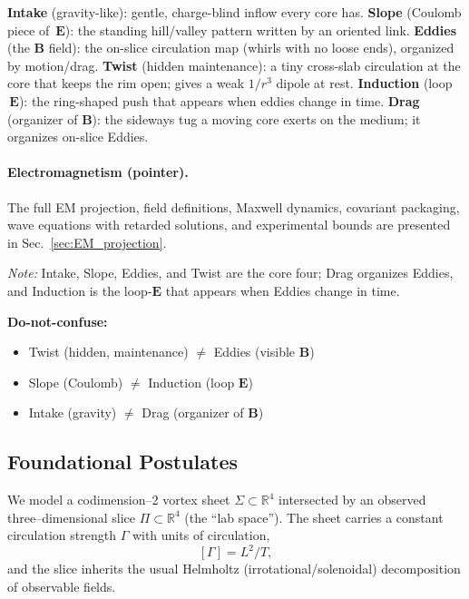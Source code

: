 \begin{tcolorbox}[title=Terminology spine (plain language)]
\textbf{Intake} (gravity-like): gentle, charge-blind inflow every core has.
\textbf{Slope} (Coulomb piece of $\,\mathbf E$): the standing hill/valley pattern written by an oriented link.
\textbf{Eddies} (the $\mathbf B$ field): the on-slice circulation map (whirls with no loose ends), organized by motion/drag.
\textbf{Twist} (hidden maintenance): a tiny cross-slab circulation at the core that keeps the rim open; gives a weak $1/r^3$ dipole at rest.
\textbf{Induction} (loop $\,\mathbf E$): the ring-shaped push that appears when eddies change in time.
\textbf{Drag} (organizer of $\mathbf B$): the sideways tug a moving core exerts on the medium; it organizes on-slice Eddies.
\end{tcolorbox}

\paragraph{Electromagnetism (pointer).}
The full EM projection, field definitions, Maxwell dynamics, covariant packaging, wave equations with retarded solutions, and experimental bounds are presented in Sec.~\ref{sec:EM_projection}.

\emph{Note:} Intake, Slope, Eddies, and Twist are the core four; Drag organizes Eddies, and Induction is the loop-$\mathbf E$ that appears when Eddies change in time.

\begin{tcolorbox}[colback=gray!5,colframe=gray!35!black,arc=1mm,boxrule=0.3pt,left=1mm,right=1mm,top=0.5mm,bottom=0.5mm]
\textbf{Do-not-confuse:}
\begin{itemize}
  \item Twist (hidden, maintenance) $\neq$ Eddies (visible $\mathbf B$)
  \item Slope (Coulomb) $\neq$ Induction (loop $\mathbf E$)
  \item Intake (gravity) $\neq$ Drag (organizer of $\mathbf B$)
\end{itemize}
\end{tcolorbox}

\subsection{Foundational Postulates}
\label{sec:foundational-postulates}

We model a codimension–2 vortex sheet $\Sigma\subset\mathbb{R}^4$ intersected by an observed three–dimensional slice $\Pi\subset\mathbb{R}^4$ (the “lab space”). The sheet carries a constant circulation strength $\Gamma$ with units of circulation,
\[
[\Gamma]=L^2/T,
\]
and the slice inherits the usual Helmholtz (irrotational/solenoidal) decomposition of observable fields.

